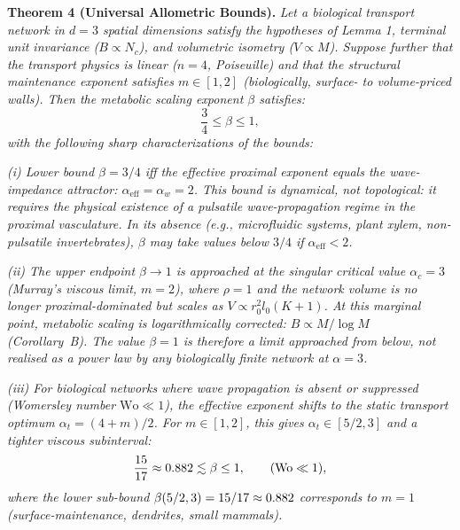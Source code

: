\documentclass[11pt,a4paper]{article}
\theoremstyle{remark}
\newcounter{manualthm}
\begin{document}
\vspace{0.8em}
\noindent \textbf{Theorem 4 (Universal Allometric Bounds).}\label{thm:bounds} \textit{Let a biological transport network in $d=3$ spatial dimensions satisfy the hypotheses of Lemma 1, terminal unit invariance ($B \propto N_c$), and volumetric isometry ($V \propto M$). Suppose further that the transport physics is linear ($n=4$, Poiseuille) and that the structural maintenance exponent satisfies $m \in [1, 2]$ (biologically, surface- to volume-priced walls). Then the metabolic scaling exponent $\beta$ satisfies:}
\begin{equation}
\frac{3}{4} \leq \beta \leq 1,
\end{equation}
\textit{with the following sharp characterizations of the bounds:}

\textit{(i) Lower bound $\beta = 3/4$ iff the effective proximal exponent equals the wave-impedance attractor: $\alpha_{\mathrm{eff}} = \alpha_w = 2$. This bound is dynamical, not topological: it requires the physical existence of a pulsatile wave-propagation regime in the proximal vasculature. In its absence (e.g., microfluidic systems, plant xylem, non-pulsatile invertebrates), $\beta$ may take values below $3/4$ if $\alpha_{\mathrm{eff}} < 2$.}

\textit{(ii) The upper endpoint $\beta \to 1$ is approached at the singular critical value $\alpha_c = 3$ (Murray's viscous limit, $m=2$), where $\rho = 1$ and the network volume is no longer proximal-dominated but scales as $V \propto r_0^2 l_0 (K+1)$. At this marginal point, metabolic scaling is logarithmically corrected: $B \propto M/\log M$ (Corollary~B). The value $\beta = 1$ is therefore a limit approached from below, not realised as a power law by any biologically finite network at $\alpha = 3$.}

\textit{(iii) For biological networks where wave propagation is absent or suppressed (Womersley number $\mathrm{Wo} \ll 1$), the effective exponent shifts to the static transport optimum $\alpha_t = (4+m)/2$. For $m \in [1,2]$, this gives $\alpha_t \in [5/2, 3]$ and a tighter viscous subinterval:}
\begin{equation}
\frac{15}{17} \approx 0.882{} \lesssim \beta \leq 1, \qquad (\mathrm{Wo} \ll 1),
\end{equation}
\textit{where the lower sub-bound $\beta(5/2, 3) = 15/17 \approx 0.882{}$ corresponds to $m=1$ (surface-maintenance, dendrites, small mammals).}
\end{document}
